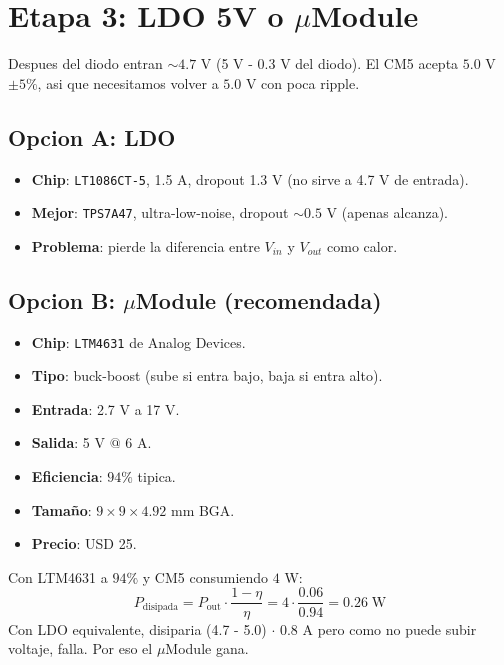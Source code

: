\documentclass[11pt,a4paper,oneside,openright]{book}
\begin{document}
\section{Etapa 3: LDO 5V o $\mu$Module}

Despues del diodo entran $\sim 4.7$ V (5 V - 0.3 V del diodo). El CM5
acepta $5.0$ V $\pm 5\%$, asi que necesitamos volver a $5.0$ V con poca
ripple.

\subsection{Opcion A: LDO}

\begin{itemize}[leftmargin=2em]
  \item \textbf{Chip}: \texttt{LT1086CT-5}, 1.5 A, dropout 1.3 V (no sirve
        a 4.7 V de entrada).
  \item \textbf{Mejor}: \texttt{TPS7A47}, ultra-low-noise, dropout
        $\sim 0.5$ V (apenas alcanza).
  \item \textbf{Problema}: pierde la diferencia entre $V_{in}$ y $V_{out}$
        como calor.
\end{itemize}

\subsection{Opcion B: $\mu$Module (recomendada)}

\begin{itemize}[leftmargin=2em]
  \item \textbf{Chip}: \texttt{LTM4631} de Analog Devices.
  \item \textbf{Tipo}: buck-boost (sube si entra bajo, baja si entra alto).
  \item \textbf{Entrada}: 2.7 V a 17 V.
  \item \textbf{Salida}: 5 V $@$ 6 A.
  \item \textbf{Eficiencia}: $94\%$ tipica.
  \item \textbf{Tamaño}: $9 \times 9 \times 4.92$ mm BGA.
  \item \textbf{Precio}: USD 25.
\end{itemize}

\begin{calculo}
Con LTM4631 a $94\%$ y CM5 consumiendo $4$ W:
\[
P_{\text{disipada}} = P_{\text{out}} \cdot \frac{1 - \eta}{\eta} = 4 \cdot \frac{0.06}{0.94} = 0.26\;\text{W}
\]
Con LDO equivalente, disiparia (4.7 - 5.0) $\cdot$ 0.8 A pero como no
puede subir voltaje, falla. Por eso el $\mu$Module gana.
\end{calculo}
\end{document}
